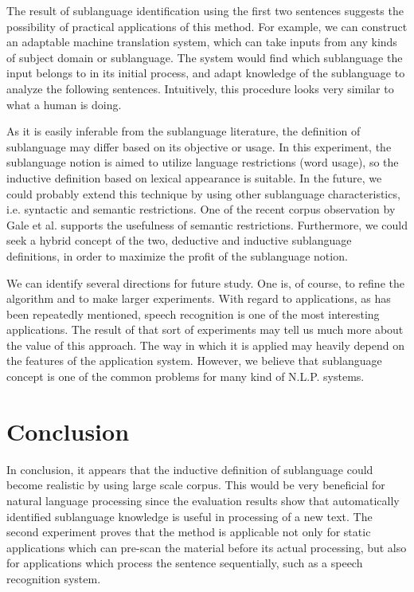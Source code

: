 The result of sublanguage identification using the first
two sentences suggests the possibility of practical applications of this method.
For example, we can construct an adaptable machine translation system,
which can take inputs from any kinds of subject domain or sublanguage.
The system would find which sublanguage the input belongs to in its initial process,
and adapt knowledge of the sublanguage to analyze the following sentences.
Intuitively, this procedure looks very similar to what a human is doing.

As it is easily inferable from the sublanguage literature,
the definition of sublanguage may differ based on its objective or usage.
In this experiment, the sublanguage notion is aimed to utilize
language restrictions (word usage),
so the inductive definition based on lexical appearance is suitable.
In the future, we could probably extend this technique by using
other sublanguage characteristics, i.e. syntactic and semantic restrictions.
One of the recent corpus observation by Gale et al. \cite{Gale:92}
supports the usefulness of semantic restrictions.
Furthermore, we could seek a hybrid concept of the two, deductive and inductive
sublanguage definitions, in order to maximize the profit of the sublanguage notion.

We can identify several directions for future study.
One is, of course, to refine the algorithm and to make larger experiments.
With regard to applications, as has been repeatedly mentioned, speech recognition
is one of the most interesting applications.
The result of that sort of experiments may tell us much more about the value of this approach.
The way in which it is applied may heavily depend on the features of the application system.
However, we believe that sublanguage concept is one of the common problems
for many kind of N.L.P. systems.

\section{Conclusion}

In conclusion, it appears that the inductive definition of sublanguage
could become realistic by using large scale corpus.
This would be very beneficial for natural language processing
since the evaluation results show that
automatically identified sublanguage knowledge is useful in processing
of a new text.
The second experiment proves that the method is applicable 
not only for static applications which can pre-scan the material
before its actual processing,
but also for applications which process the sentence sequentially,
such as a speech recognition system.



